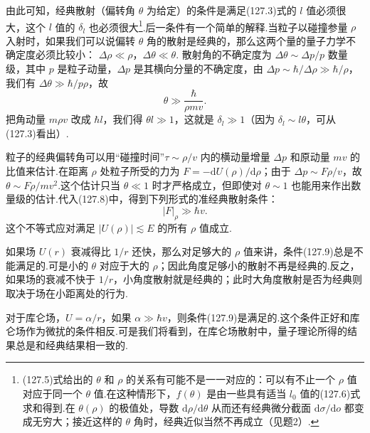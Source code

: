 由此可知，经典散射（偏转角 $\theta$ 为给定）的条件是满足(127.3)式的 $l$ 值必须很大，这个 $l$ 值的 $\delta_l$ 也必须很大\footnote{(127.5)式给出的 $\theta$ 和 $\rho$ 的关系有可能不是一一对应的：可以有不止一个 $\rho$ 值对应于同一个 $\theta$ 值.在这种情形下，$f(\theta)$ 是由一些具有适当 $l_0$ 值的(127.6)式求和得到.在 $\theta(\rho)$ 的极值处，导数 $\mathrm{d}\rho/\mathrm{d}\theta$ 从而还有经典微分截面 $\mathrm{d}\sigma/\mathrm{d}o$ 都变成无穷大；接近这样的 $\theta$ 角时，经典近似当然不再成立（见题2）.}.后一条件有一个简单的解释.当粒子以碰撞参量 $\rho$ 入射时，如果我们可以说偏转 $\theta$ 角的散射是经典的，那么这两个量的量子力学不确定度必须比较小：
$\Delta\rho\ll\rho$，$\Delta\theta\ll\theta$.
散射角的不确定度为 $\Delta\theta\sim\Delta p/p$ 数量级，其中 $p$ 是粒子动量，$\Delta p$ 是其横向分量的不确定度，由 $\Delta p\sim\hbar/\Delta\rho\gg\hbar/\rho$，我们有 $\Delta\theta\gg\hbar/p\rho$，故
\begin{equation}
  \theta\gg\frac{\hbar}{\rho mv}.
\end{equation}
把角动量 $m\rho v$ 改成 $\hbar l$，我们得 $\theta l\gg1$，这就是 $\delta_l\gg1$（因为 $\delta_l\sim l\theta$，可从(127.3)看出）.

粒子的经典偏转角可以用“碰撞时间”$\tau\sim\rho/v$ 内的横动量增量 $\Delta p$ 和原动量 $mv$ 的比值来估计.在距离 $\rho$ 处粒子所受的力为 $F=-\mathrm{d}U(\rho)/\mathrm{d}\rho$；由于 $\Delta p\sim F\rho/v$，故 $\theta\sim F\rho/mv^2$.这个估计只当 $\theta\ll1$ 时才严格成立，但即使对 $\theta\sim1$ 也能用来作出数量级的估计.代入(127.8)中，得到下列形式的准经典散射条件：
\begin{equation}
  |F|_{\rho}\gg\hbar v.
\end{equation}
这个不等式应对满足 $|U(\rho)|\lesssim E$ 的所有 $\rho$ 值成立.

如果场 $U(r)$ 衰减得比 $1/r$ 还快，那么对足够大的 $\rho$ 值来讲，条件(127.9)总是不能满足的.可是小的 $\theta$ 对应于大的 $\rho$；因此角度足够小的散射不再是经典的.反之，如果场的衰减不快于 $1/r$，小角度散射就是经典的；此时大角度散射是否为经典则取决于场在小距离处的行为.

对于库仑场，$U=\alpha/r$，如果 $\alpha\gg\hbar v$，则条件(127.9)是满足的.这个条件正好和库仑场作为微扰的条件相反.可是我们将看到，在库仑场散射中，量子理论所得的结果总是和经典结果相一致的.

